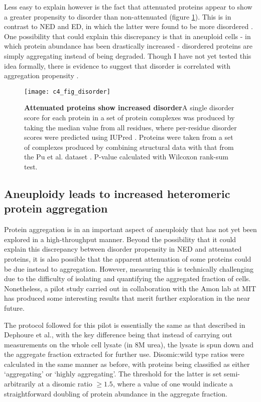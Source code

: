 \documentclass[a4paper,11pt,twoside,openright]{scrbook}
\begin{document}
Less easy to explain however is the fact that attenuated proteins appear to show a greater propensity to disorder than non-attenuated (figure \ref{figure:aneuploidy_disorder}). This is in contrast to NED and ED, in which the latter were found to be more disordered \cite{McShane2016}. One possibility that could explain this discrepancy is that in aneuploid cells - in which protein abundance has been drastically increased - disordered proteins are simply aggregating instead of being degraded. Though I have not yet tested this idea formally, there is evidence to suggest that disorder is correlated with aggregation propensity \cite{Carvalho2013}.

\begin{figure}[h]
\fcapsideright
    {\caption[Attenuated proteins show increased disorder]{\sffamily\textbf{Attenuated proteins show increased disorder}\newline \small A single disorder score for each protein in a set of protein complexes was produced by taking the median value from all residues, where per-residue disorder scores were predicted using IUPred \cite{Dosztanyi2005}. Proteins were taken from a set of complexes produced by combining structural data with that from the Pu et al. dataset \cite{Pu2009}. P-value calculated with Wilcoxon rank-sum test.}\label{figure:aneuploidy_disorder}}
    {\texttt{[image: c4\_fig\_disorder]}}
\end{figure}

\subsection{Aneuploidy leads to increased heteromeric protein aggregation}
Protein aggregation is in an important aspect of aneuploidy that has not yet been explored in a high-throughput manner. Beyond the possibility that it could explain this discrepancy between disorder propensity in NED and attenuated proteins, it is also possible that the apparent attenuation of some proteins could be due instead to aggregation. However, measuring this is technically challenging due to the difficulty of isolating and quantifying the aggregated fraction of cells. Nonetheless, a pilot study carried out in collaboration with the Amon lab at MIT has produced some interesting results that merit further exploration in the near future.

The protocol followed for this pilot is essentially the same as that described in Dephoure et al., with the key difference being that instead of carrying out measurements on the whole cell lysate (in 8M urea), the lysate is spun down and the aggregate fraction extracted for further use. Disomic:wild type ratios were calculated in the same manner as before, with proteins being classified as either `aggregating' or `highly aggregating'. The threshold for the latter is set semi-arbitrarily at a disomic ratio $\geq 1.5$, where a value of one would indicate a straightforward doubling of protein abundance in the aggregate fraction.
\end{document}
